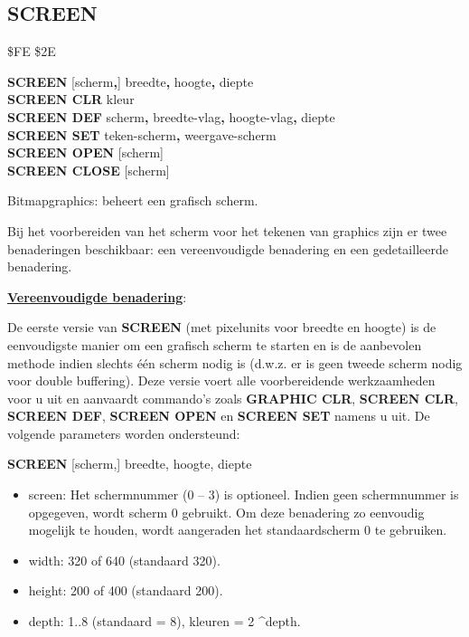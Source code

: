 \subsection{SCREEN}
\begin{description}[leftmargin=2cm,style=nextline]
\item [Token:]    \$FE \$2E

\item [Formaat:]   {\bf SCREEN} [scherm{\bf,}] breedte{\bf,} hoogte{\bf,} diepte \\             {\bf SCREEN CLR} kleur \\                  {\bf SCREEN DEF} scherm{\bf,} breedte-vlag{\bf,} hoogte-vlag{\bf,} diepte \\                  {\bf SCREEN SET} teken-scherm{\bf,} weergave-scherm \\                  {\bf SCREEN OPEN} [scherm] \\                  {\bf SCREEN CLOSE} [scherm]

\item [Gebruik:]    Bitmapgraphics: beheert een grafisch scherm.

                  Bij het voorbereiden van het scherm voor het tekenen van graphics zijn er twee benaderingen beschikbaar: een vereenvoudigde benadering en een gedetailleerde benadering.

                  \underline{{\bf Vereenvoudigde benadering}}:

                  De eerste versie van {\bf SCREEN} (met pixelunits voor breedte en hoogte) is de eenvoudigste manier om een grafisch scherm te starten en is de aanbevolen methode indien slechts één scherm nodig is (d.w.z. er is geen tweede scherm nodig voor double buffering). Deze versie voert alle voorbereidende werkzaamheden voor u uit en aanvaardt commando's zoals {\bf GRAPHIC CLR}, {\bf SCREEN CLR}, {\bf SCREEN DEF}, {\bf SCREEN OPEN} en {\bf SCREEN SET} namens u uit. De volgende parameters worden ondersteund:

{\bf SCREEN} [scherm,] breedte, hoogte, diepte

                  \begin{itemize}
                     \item screen: Het schermnummer (0 -- 3) is optioneel. Indien geen schermnummer is opgegeven, wordt scherm 0 gebruikt. Om deze benadering zo eenvoudig mogelijk te houden, wordt aangeraden het standaardscherm 0 te gebruiken.                     \item width: 320 of 640 (standaard 320).                     \item height: 200 of 400 (standaard 200).                     \item depth: 1..8 (standaard = 8), kleuren = 2 \textasciicircum depth.
                  \end{itemize}


\end{description}

